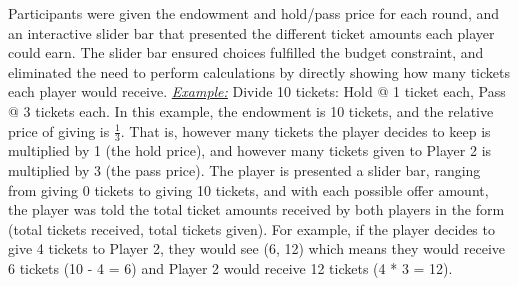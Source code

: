 \documentclass[12pt]{article}
\begin{document}
\begin{itemize}
Participants were given the endowment and hold/pass price for each round, and an interactive slider bar that presented the different ticket amounts each player could earn. The slider bar ensured choices fulfilled the budget constraint, and eliminated the need to perform calculations by directly showing how many tickets each player would receive.
\subitem \underline{\textit{Example:}} Divide 10 tickets: Hold @ 1 ticket each, Pass @ 3 tickets each. In this example, the endowment is 10 tickets, and the relative price of giving is \(\frac{1}{3}\). That is, however many tickets the player decides to keep is multiplied by 1 (the hold price), and however many tickets given to Player 2 is multiplied by 3 (the pass price). The player is presented a slider bar, ranging from giving 0 tickets to giving 10 tickets, and with each possible offer amount, the player was told the total ticket amounts received by both players in the form (total tickets received, total tickets given). For example, if the player decides to give 4 tickets to Player 2, they would see (6, 12) which means they would receive 6 tickets (10 - 4 = 6) and Player 2 would receive 12 tickets (4 * 3 = 12).


\end{itemize}
\end{document}
